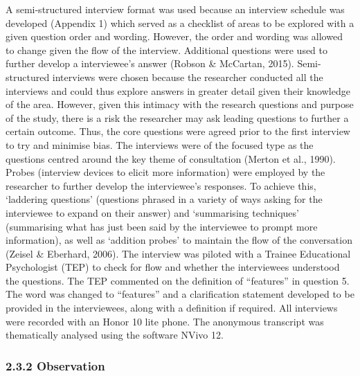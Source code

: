 \documentclass[
  english,
  man]{apa}
\begin{document}
A semi-structured interview format was used because an interview schedule was developed (Appendix 1) which served as a checklist of areas to be explored with a given question order and wording. However, the order and wording was allowed to change given the flow of the interview. Additional questions were used to further develop a interviewee's answer (Robson \& McCartan, 2015). Semi-structured interviews were chosen because the researcher conducted all the interviews and could thus explore answers in greater detail given their knowledge of the area. However, given this intimacy with the research questions and purpose of the study, there is a risk the researcher may ask leading questions to further a certain outcome. Thus, the core questions were agreed prior to the first interview to try and minimise bias. The interviews were of the focused type as the questions centred around the key theme of consultation (Merton et al., 1990). Probes (interview devices to elicit more information) were employed by the researcher to further develop the interviewee's responses. To achieve this, `laddering questions' (questions phrased in a variety of ways asking for the interviewee to expand on their answer) and `summarising techniques' (summarising what has just been said by the interviewee to prompt more information), as well as `addition probes' to maintain the flow of the conversation (Zeisel \& Eberhard, 2006). The interview was piloted with a Trainee Educational Psychologist (TEP) to check for flow and whether the interviewees understood the questions. The TEP commented on the definition of ``features'' in question 5. The word was changed to ``features'' and a clarification statement developed to be provided in the interviewees, along with a definition if required. All interviews were recorded with an Honor 10 lite phone. The anonymous transcript was thematically analysed using the software NVivo 12.

\hypertarget{observation}{%
\subsubsection{2.3.2 Observation}\label{observation}}
\end{document}
